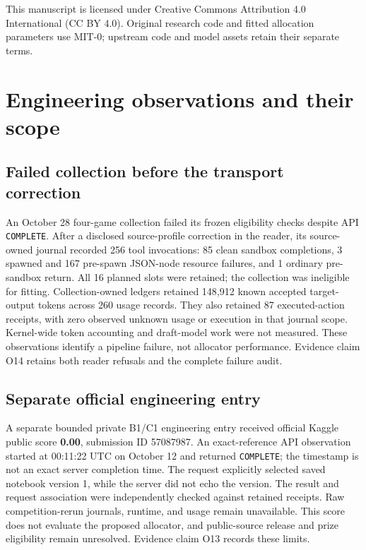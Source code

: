 \documentclass[11pt]{article}
\begin{document}
This manuscript is licensed under Creative Commons Attribution 4.0 International (CC BY 4.0). Original research code and fitted allocation parameters use MIT-0; upstream code and model assets retain their separate terms.

\appendix
\section{Engineering observations and their scope}\label{app:engineering}
\subsection{Failed collection before the transport correction}
An October 28 four-game collection failed its frozen eligibility checks despite API \texttt{COMPLETE}. After a disclosed source-profile correction in the reader, its source-owned journal recorded 256 tool invocations: 85 clean sandbox completions, 3 spawned and 167 pre-spawn JSON-node resource failures, and 1 ordinary pre-sandbox return. All 16 planned slots were retained; the collection was ineligible for fitting. Collection-owned ledgers retained 148,912 known accepted target-output tokens across 260 usage records. They also retained 87 executed-action receipts, with zero observed unknown usage or execution in that journal scope. Kernel-wide token accounting and draft-model work were not measured. These observations identify a pipeline failure, not allocator performance. Evidence claim O14 retains both reader refusals and the complete failure audit.

\subsection{Separate official engineering entry}
A separate bounded private B1/C1 engineering entry received official Kaggle public score \textbf{0.00}, submission ID 57087987. An exact-reference API observation started at 00:11:22 UTC on October 12 and returned \texttt{COMPLETE}; the timestamp is not an exact server completion time. The request explicitly selected saved notebook version 1, while the server did not echo the version. The result and request association were independently checked against retained receipts. Raw competition-rerun journals, runtime, and usage remain unavailable. This score does not evaluate the proposed allocator, and public-source release and prize eligibility remain unresolved. Evidence claim O13 records these limits.
\end{document}
